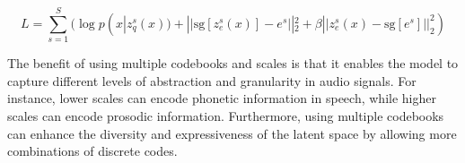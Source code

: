 \begin{equation} \label{eq:ms-vq-vae-loss}
 L = \sum_{s=1}^{S} (\log p(x|z_q^s(x)) + ||\text{sg}[z_e^s(x)] - e^s||_2^2 + \beta||z_e^s(x) - \text{sg}[e^s]||_2^2)
\end{equation}

The benefit of using multiple codebooks and scales is that it enables the model to capture different levels of abstraction and granularity in audio signals. For instance, lower scales can encode phonetic information in speech, while higher scales can encode prosodic information. Furthermore, using multiple codebooks can enhance the diversity and expressiveness of the latent space by allowing more combinations of discrete codes.
